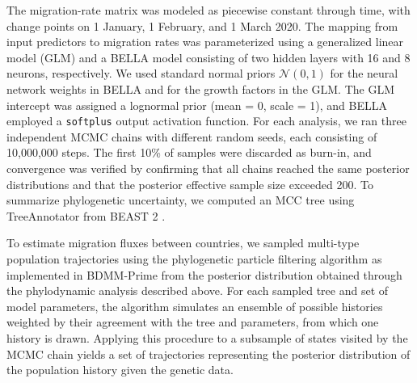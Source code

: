 The migration-rate matrix was modeled as piecewise constant through time, with change points on 1 January, 1 February, and 1 March 2020. The mapping from input predictors to migration rates was parameterized using a generalized linear model (GLM) and a BELLA model consisting of two hidden layers with 16 and 8 neurons, respectively.
We used standard normal priors \(\mathcal{N}(0, 1)\) for the neural network weights in BELLA and for the growth factors in the GLM. The GLM intercept was assigned a lognormal prior (mean = 0, scale = 1), and BELLA employed a \texttt{softplus} output activation function.
For each analysis, we ran three independent MCMC chains with different random seeds, each consisting of 10,000,000 steps. The first 10\% of samples were discarded as burn-in, and convergence was verified by confirming that all chains reached the same posterior distributions and that the posterior effective sample size exceeded 200.
To summarize phylogenetic uncertainty, we computed an MCC tree using TreeAnnotator from BEAST 2 \cite{bouckaert2019beast}.

To estimate migration fluxes between countries, we sampled multi-type population trajectories using the phylogenetic particle filtering algorithm \cite{vaughan2019estimating} as implemented in BDMM-Prime \cite{Vaughan2025BDMM} from the posterior distribution obtained through the phylodynamic analysis described above.
For each sampled tree and set of model parameters, the algorithm simulates an ensemble of possible histories weighted by their agreement with the tree and parameters, from which one history is drawn.
Applying this procedure to a subsample of states visited by the MCMC chain yields a set of trajectories representing the posterior distribution of the population history given the genetic data.
